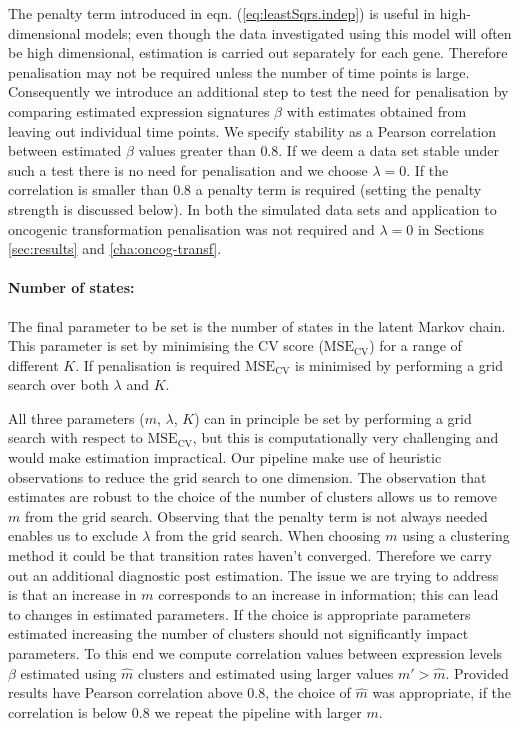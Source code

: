The penalty term introduced in eqn. (\ref{eq:leastSqrs.indep}) is useful in high-dimensional models; even though the data investigated using this model will often be high dimensional, estimation is carried out separately for each gene. Therefore penalisation may not be required unless the number of time points is large. Consequently we introduce an additional step to test the need for penalisation by comparing estimated expression signatures $\beta$ with estimates obtained from leaving out individual time points. We specify stability as a Pearson correlation between estimated $\beta$ values  greater than $0.8$. If we deem a data set stable under such a test there is no need for penalisation and we choose $\lambda=0$. If the correlation is smaller than $0.8$ a penalty term is required (setting the penalty strength is discussed below). In both the simulated data sets and application to oncogenic transformation penalisation was not required and $\lambda=0$ in Sections \ref{sec:results} and \ref{cha:oncog-transf}. 

\paragraph{Number of states:}
\label{sec:number-states}

The final parameter to be set is the number of states in the latent Markov chain. This parameter is set by minimising the CV score ($\mathrm{MSE_{CV}}$) for a range of different $K$. If penalisation is required $\mathrm{MSE_{CV}}$ is minimised by performing a grid search over both $\lambda$ and $K$.

All three parameters ($m$, $\lambda$, $K$) can in principle be set by performing a grid search with respect to $\mathrm{MSE_{CV}}$, but this is computationally very challenging and would make estimation impractical. Our pipeline make use of heuristic observations to reduce the grid search to one dimension. The observation that estimates are robust to the choice of the number of clusters allows us to remove $m$ from the grid search. Observing that the penalty term is not always needed enables us to exclude $\lambda$ from the grid search. When choosing $m$ using a clustering method it could be that transition rates haven't converged. Therefore we carry out an additional diagnostic post estimation. The issue we are trying to address is that an increase in $m$ corresponds to an increase in information; this can lead to changes in estimated parameters. If the choice is appropriate parameters estimated increasing the number of clusters should not significantly impact parameters. To this end we compute correlation values between expression levels $\beta$ estimated using $\hat{m}$ clusters and estimated using larger values $m' > \hat{m}$. Provided results have Pearson correlation above $0.8$, the choice of $\hat{m}$ was appropriate, if the correlation is below $0.8$ we repeat the pipeline with larger $m$. 

